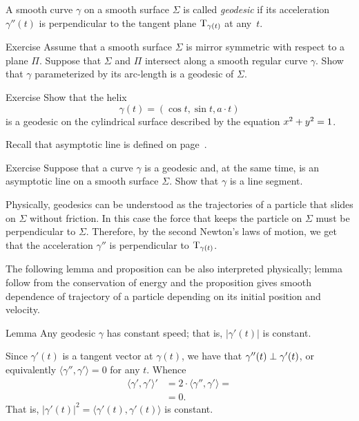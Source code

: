 A smooth curve $\gamma$ on a smooth surface $\Sigma$ is called \emph{geodesic} if its acceleration $\gamma''(t)$ is perpendicular to the tangent plane $\mathrm{T}_{\gamma(t)}$ at any~$t$.

\begin{thm}{Exercise}\label{ex:reflection-geodesic}
Assume that a smooth surface $\Sigma$ is mirror symmetric with respect to  a plane $\Pi$.
Suppose that $\Sigma$ and $\Pi$ intersect along a smooth regular curve $\gamma$.
Show that $\gamma$ parameterized by its arc-length is a geodesic of $\Sigma$.
\end{thm}

\begin{thm}{Exercise}\label{ex:helix=geodesic}
Show that the helix 
\[\gamma(t)=(\cos t,\sin t, a\cdot t)\]
is a geodesic on the cylindrical surface described by the equation $x^2\z+y^2=1$.
\end{thm}

Recall that asymptotic line is defined on page~\pageref{page:asymptotic line}.

\begin{thm}{Exercise}\label{ex:asymptotic-geodesic}
Suppose that a curve $\gamma$ is a geodesic and, at the same time, is an asymptotic line on a smooth surface $\Sigma$.
Show that $\gamma$ is a line segment.
\end{thm}

Physically, geodesics can be understood as the trajectories of a particle that slides on $\Sigma$ without friction.
In this case the force that keeps the particle on $\Sigma$ must be perpendicular to $\Sigma$.
Therefore, by the second Newton's laws of motion,
we get that the acceleration $\gamma''$ is perpendicular to $\mathrm{T}_{\gamma(t)}$.

The following lemma and proposition can be also interpreted physically;
lemma follow from the conservation of energy and the proposition gives smooth dependence of trajectory of a particle depending on its initial position and velocity.

\begin{thm}{Lemma}\label{lem:constant-speed}
Any geodesic $\gamma$ has constant speed; that is, $|\gamma'(t)|$ is constant.
\end{thm}

Since $\gamma'(t)$ is a tangent vector at $\gamma(t)$,
we have that $\gamma''(t)\z\perp\gamma'(t)$, or equivalently $\langle\gamma'',\gamma'\rangle=0$ for any $t$.
Whence 
\begin{align*}
\langle\gamma',\gamma'\rangle'&=2\cdot \langle\gamma'',\gamma'\rangle=
\\
&=0.
\end{align*}
That is, $|\gamma'(t)|^2=\langle\gamma'(t),\gamma'(t)\rangle$ is constant.
\qeds

